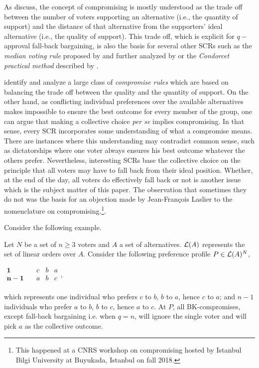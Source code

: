 \documentclass[version=3.21, pagesize, twoside=off, bibliography=totoc, DIV=calc, fontsize=12pt, a4paper]{scrartcl}
\begin{document}
As \citet{OezkalSanver2004} discuss, the concept of compromising is mostly understood as the trade off between the number of voters supporting an alternative (i.e., the quantity of support) and the distance of that alternative from the supporters' ideal alternative (i.e., the quality of support). This trade off, which is explicit for $q-$approval fall-back bargaining, is also the basis for several other \acp{SCR} such as the \textit{median voting rule} proposed by \citet{Bassett1999} and further analyzed by \citet{Gehrlein2003} or the \textit{Condorcet practical method }described by \citet{Nurmi1999}.

\citet{Merlin2019} identify and analyze a large class of \textit{compromise rules} which are based on balancing the trade off between the quality and the quantity of support. On the other hand, as conflicting
individual preferences over the available alternatives makes impossible to ensure the best outcome for every member of the group, one can argue that making a collective choice \textit{per se} implies compromising. In that sense, every \ac{SCR} incorporates some understanding of what a compromise means. There are instances where this understanding may contradict common sense, such as dictatorships where one voter always ensures his best outcome whatever the others prefer. Nevertheless, interesting \acp{SCR} base the collective choice on the principle that all voters may have to fall back from their ideal position. Whether, at the end of the day, all voters do effectively fall back or not is another issue which is the subject matter of this paper. The observation that sometimes they do not was the basis for an objection made by Jean-François Laslier to the nomenclature on compromising.\footnote{This happened at a CNRS workshop on compromising hosted by Istanbul Bilgi University at Buyukada, Istanbul on fall 2018.}.

Consider the following example.
\begin{example}
	\label{ex:ex1}
	Let $N$ be a set of $n ≥ 3$ voters and $A$ a set of alternatives. $\mathcal{L}(A)$ represents the set of linear orders over $A$. Consider the following preference profile $P\in \mathcal{L}(A)^{N}$,
	\begin{center}
		$
		\begin{array}{cccc}
		\mathbf{1} \quad &c&b&a\\
		\mathbf{n-1} \quad &a&b&c\\
		\end{array},
		$
	\end{center}
	which represents one individual who prefers $c$ to $b$, $b$ to $a$, hence $c$ to $a$; and $n-1$ individuals who prefer $a$ to $b$, $b$ to $c$, hence $a$ to $c$. At $P$, all BK-compromises, except fall-back bargaining i.e. when $q=n$, will ignore the single voter and will pick $a$ as the collective outcome.
\end{example}
\end{document}
